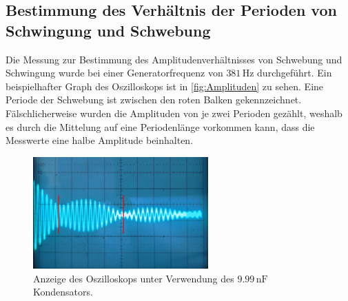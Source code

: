 \subsection{Bestimmung des Verhältnis der Perioden von Schwingung und Schwebung}
\label{subsec:A_Amplituden}
Die Messung zur Bestimmung des Amplitudenverhältnisses von Schwebung und Schwingung wurde bei einer Generatorfrequenz von $381 \, \unit{\hertz}$ durchgeführt.
Ein beispielhafter Graph des Oszilloskops ist in \autoref{fig:Amplituden} zu sehen. Eine Periode der Schwebung ist zwischen den roten Balken gekennzeichnet.
Fälschlicherweise wurden die Amplituden von je zwei Perioden gezählt, weshalb es durch die Mittelung auf eine Periodenlänge vorkommen kann, dass die Messwerte eine 
\dq halbe\dq \; Amplitude beinhalten.
\begin{figure}
    \centering 
    \caption{Anzeige des Oszilloskops unter Verwendung des $9.99 \, \unit{\nano\farad}$ Kondensators.}
    \label{fig:Amplituden}
    \includegraphics[width = 0.6\textwidth]{content/Amplituden.jpg}
\end{figure}

